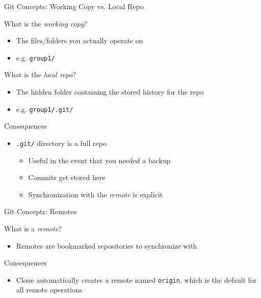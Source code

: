 \documentclass[table,dvipsnames]{beamer}
\begin{document}
\begin{frame}{Git Concepts: Working Copy vs. Local Repo}
	\begin{block}{What is the \emph{working copy}?}
		\begin{itemize}
			\item The files/folders you actually operate on
			\item e.g. \texttt{group1/}
		\end{itemize}
	\end{block}
	\begin{block}{What is the \emph{local repo}?}
		\begin{itemize}
			\item The hidden folder containing the stored history for the repo
			\item e.g. \texttt{group1/.git/}
		\end{itemize}
	\end{block}
	\begin{block}{Consequences}
		\begin{itemize}
			\item \texttt{.git/} directory is a full repo
				\begin{itemize}
					\item Useful in the event that you needed a backup
					\item Commits get stored here
					\item Synchronization with the \emph{remote} is explicit
				\end{itemize}
		\end{itemize}
	\end{block}
\end{frame}

\begin{frame}{Git Concepts: Remotes}
	\begin{block}{What is a \emph{remote}?}
		\begin{itemize}
			\item Remotes are bookmarked repositories to synchronize with
		\end{itemize}
	\end{block}
	\begin{block}{Consequences}
		\begin{itemize}
			\item Clone automatically creates a remote named \texttt{origin}, 
				which is the default for all remote operations
		\end{itemize}
	\end{block}
\end{frame}
\end{document}
